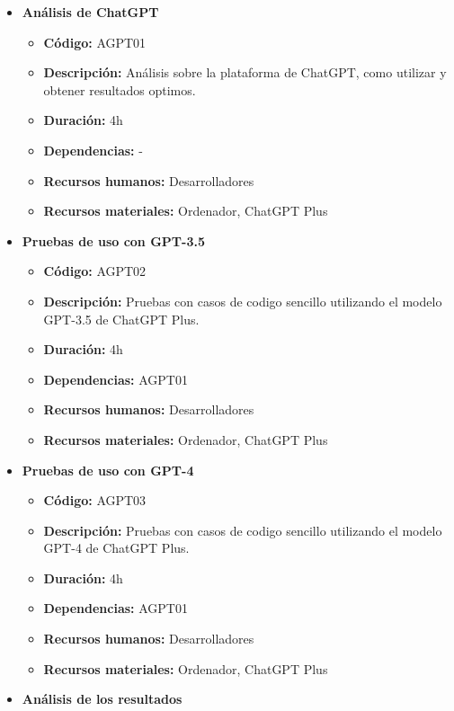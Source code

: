\begin{itemize}
    \item \textbf{Análisis de ChatGPT}
        \begin{itemize}
            \item \textbf{Código:} AGPT01
            \item \textbf{Descripción:} Análisis sobre la plataforma de ChatGPT, como utilizar y obtener resultados optimos.
            \item \textbf{Duración:} 4h
            \item \textbf{Dependencias:} -
            \item \textbf{Recursos humanos:} Desarrolladores
            \item \textbf{Recursos materiales:} Ordenador, ChatGPT Plus
        \end{itemize}
    \item \textbf{Pruebas de uso con GPT-3.5}
        \begin{itemize}
            \item \textbf{Código:} AGPT02
            \item \textbf{Descripción:} Pruebas con casos de codigo sencillo utilizando el modelo GPT-3.5 de ChatGPT Plus.
            \item \textbf{Duración:} 4h
            \item \textbf{Dependencias:} AGPT01
            \item \textbf{Recursos humanos:} Desarrolladores
            \item \textbf{Recursos materiales:} Ordenador, ChatGPT Plus
        \end{itemize}
    \item \textbf{Pruebas de uso con GPT-4}
        \begin{itemize}
            \item \textbf{Código:} AGPT03
            \item \textbf{Descripción:} Pruebas con casos de codigo sencillo utilizando el modelo GPT-4 de ChatGPT Plus.
            \item \textbf{Duración:} 4h
            \item \textbf{Dependencias:} AGPT01
            \item \textbf{Recursos humanos:} Desarrolladores
            \item \textbf{Recursos materiales:} Ordenador, ChatGPT Plus
        \end{itemize}
    \item \textbf{Análisis de los resultados}

\end{itemize}

